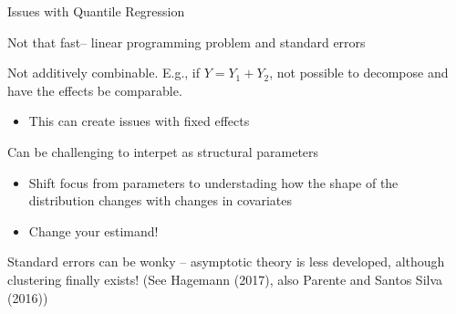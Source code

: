 \documentclass[notes,11pt, aspectratio=169]{beamer}
\newenvironment{wideitemize}{\itemize\addtolength{\itemsep}{10pt}}{\enditemize}
\begin{document}
\begin{frame}{Issues with Quantile Regression}
  \begin{wideitemize}
  \item Not that fast-- linear programming problem and standard errors
  \item Not additively combinable. E.g., if $Y = Y_{1} + Y_{2}$, not
    possible to decompose and have the effects be comparable.
    \begin{itemize}
    \item This can create issues with fixed effects
    \end{itemize}
  \item Can be challenging to interpet as structural parameters
    \begin{itemize}
    \item Shift focus from parameters to understading how the shape of
      the distribution changes with changes in covariates
    \item Change your estimand!
    \end{itemize}
  \item Standard errors can be wonky -- asymptotic theory is less
    developed, although clustering finally exists! (See Hagemann
    (2017), also Parente and Santos Silva (2016))
  \end{wideitemize}
\end{frame}
\end{document}
